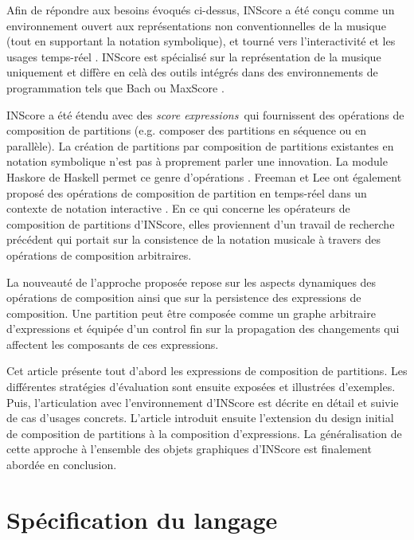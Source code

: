 \documentclass{article}
\newcommand{\sExprs}{\emph{score expressions}}
\begin{document}
Afin de répondre aux besoins évoqués ci-dessus, INScore \cite{Fober:12a,fober14c} a été conçu comme un environnement ouvert aux représentations non conventionnelles de la musique (tout en supportant la notation symbolique), et tourné vers l'interactivité et les usages temps-réel \cite{Fober:13b, Fober:14b}. INScore est spécialisé sur la représentation de la musique uniquement et diffère en celà des outils intégrés dans des environnements de programmation tels que Bach \cite{agostini12b} ou MaxScore \cite{didko08}. 

INScore a été étendu avec des \sExprs\ qui fournissent des opérations de composition de partitions (e.g. composer des partitions en séquence ou en parallèle). La création de partitions par composition de partitions existantes en notation symbolique n'est pas à proprement parler une innovation. La module Haskore de Haskell permet ce genre d'opérations  \cite{haskore}. Freeman et Lee ont également proposé des opérations de composition de partition en temps-réel dans un contexte de notation interactive \cite{Lee:2013}. En ce qui concerne les opérateurs de composition de partitions d'INScore, elles proviennent d'un travail de recherche précédent \cite{fober12b} qui portait sur la consistence de la notation musicale à travers des opérations de composition arbitraires.

La nouveauté de l'approche proposée repose sur les aspects dynamiques des opérations de composition ainsi que sur la persistence des expressions de composition. Une partition peut être composée comme un graphe arbitraire d'expressions et équipée d'un control fin sur la propagation des changements qui affectent les composants de ces expressions.

Cet article présente tout d'abord les expressions de composition de partitions. Les différentes stratégies d'évaluation sont ensuite exposées et illustrées d'exemples. Puis, l'articulation avec l'environnement d'INScore est décrite en détail et suivie de cas d'usages concrets. L'article introduit ensuite l'extension du design initial de composition de partitions à la composition d'expressions. La généralisation de cette approche à l'ensemble des objets graphiques d'INScore est finalement abordée en conclusion.


\section{Spécification du langage}\label{language}
\end{document}

